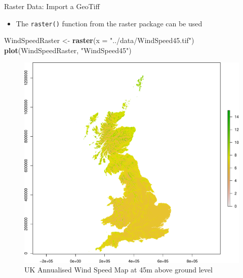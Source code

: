\documentclass[10pt,ignorenonframetext,]{beamer}
\newenvironment{Shaded}{\begin{snugshade}}{\end{snugshade}}
\newcommand{\KeywordTok}[1]{\textcolor[rgb]{0.13,0.29,0.53}{\textbf{{#1}}}}
\newcommand{\DataTypeTok}[1]{\textcolor[rgb]{0.13,0.29,0.53}{{#1}}}
\newcommand{\StringTok}[1]{\textcolor[rgb]{0.31,0.60,0.02}{{#1}}}
\newcommand{\NormalTok}[1]{{#1}}
\providecommand{\tightlist}{%
  \setlength{\itemsep}{0pt}\setlength{\parskip}{0pt}}
\begin{document}
\begin{frame}[fragile]{Raster Data: Import a GeoTiff}

\begin{itemize}
\tightlist
\item
  The \texttt{raster()} function from the \alert{raster} package can be
  used
\end{itemize}

\begin{Shaded}
\begin{Highlighting}[]
\NormalTok{WindSpeedRaster <-}\StringTok{ }\KeywordTok{raster}\NormalTok{(}\DataTypeTok{x =} \StringTok{"../data/WindSpeed45.tif"}\NormalTok{)}
\KeywordTok{plot}\NormalTok{(WindSpeedRaster, }\StringTok{"WindSpeed45"}\NormalTok{)}
\end{Highlighting}
\end{Shaded}

\begin{figure}

{\centering \includegraphics[width=0.6\linewidth]{SpatialDataLecture_files/figure-beamer/get_rasterdir_pictures-1} 

}

\caption{UK Annualised Wind Speed Map at 45m above ground level}\label{fig:get_rasterdir_pictures}
\end{figure}

\end{frame}
\end{document}
